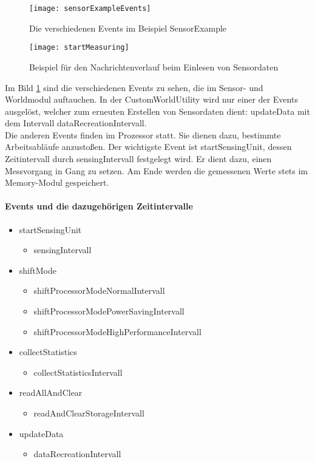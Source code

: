 \begin{figure}[htbp]
\centering
\caption{Die verschiedenen Events im Beispiel SensorExample}
\label{fig:seEvents}
\texttt{[image: sensorExampleEvents]}
\end{figure}

\begin{figure}[htbp]
\centering
\caption{Beispiel für den Nachrichtenverlauf beim Einlesen von Sensordaten}
\label{fig:seStartMeasuring}
\texttt{[image: startMeasuring]}
\end{figure}

Im Bild \ref{fig:seEvents} sind die verschiedenen Events zu sehen, die im Sensor- und Worldmodul auftauchen. In der CustomWorldUtility wird nur einer der Events ausgelöst, welcher zum erneuten Erstellen von Sensordaten dient: updateData mit dem Intervall dataRecreationIntervall.\\
Die anderen Events finden im Prozessor statt. Sie dienen dazu, bestimmte Arbeitsabläufe anzustoßen. Der wichtigste Event ist startSensingUnit, dessen Zeitintervall durch sensingIntervall festgelegt wird. Er dient dazu, einen Messvorgang in Gang zu setzen. Am Ende werden die gemessenen Werte stets im Memory-Modul gespeichert. 

\newpage
\paragraph{Events und die dazugehörigen Zeitintervalle}
\begin{itemize}
\item startSensingUnit
\begin{itemize}
\item sensingIntervall
\end{itemize}
\item shiftMode
\begin{itemize}
\item shiftProcessorModeNormalIntervall
\item shiftProcessorModePowerSavingIntervall
\item shiftProcessorModeHighPerformanceIntervall
\end{itemize}
\item collectStatistics
\begin{itemize}
\item collectStatisticsIntervall
\end{itemize}
\item readAllAndClear
\begin{itemize}
\item readAndClearStorageIntervall
\end{itemize}
\item updateData
\begin{itemize}
\item dataRecreationIntervall
\end{itemize}
\end{itemize}

